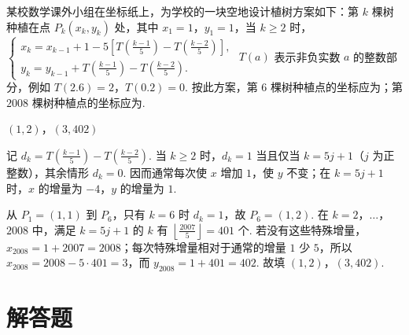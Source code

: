 \begin{problem}
某校数学课外小组在坐标纸上，为学校的一块空地设计植树方案如下：第 \(k\) 棵树种植在点 \(P_{k}(x_{k},y_{k})\) 处，其中 \(x_{1} = 1\)，\(y_{1} = 1\)，当 \(k \geqslant 2\) 时，\(\begin{cases}
x_{k} = x_{k - 1} + 1 - 5\left[ T\left(\frac{k - 1}{5}\right) - T\left(\frac{k - 2}{5}\right) \right],\\
y_{k} = y_{k - 1} + T\left(\frac{k - 1}{5}\right) - T\left(\frac{k - 2}{5}\right).
\end{cases}\) \(T(a)\) 表示非负实数 \(a\) 的整数部分，例如 \(T(2.6) = 2\)，\(T(0.2) = 0\). 按此方案，第 \(6\) 棵树种植点的坐标应为\fillinblank{}；第 \(2008\) 棵树种植点的坐标应为\fillinblank{}.

\begin{answer}
\((1,2)\)，\((3,402)\)
\end{answer}

\begin{solution}
记 \(d_k=T\left(\frac{k-1}{5}\right)-T\left(\frac{k-2}{5}\right)\). 当 \(k\geqslant2\) 时，\(d_k=1\) 当且仅当 \(k=5j+1\)（\(j\) 为正整数），其余情形 \(d_k=0\). 因而通常每次使 \(x\) 增加 \(1\)，使 \(y\) 不变；在 \(k=5j+1\) 时，\(x\) 的增量为 \(-4\)，\(y\) 的增量为 \(1\).

从 \(P_1=(1,1)\) 到 \(P_6\)，只有 \(k=6\) 时 \(d_k=1\)，故 \(P_6=(1,2)\). 在 \(k=2\)，\(\ldots\)，\(2008\) 中，满足 \(k=5j+1\) 的 \(k\) 有 \(\left\lfloor\frac{2007}{5}\right\rfloor=401\) 个. 若没有这些特殊增量，\(x_{2008}=1+2007=2008\)；每次特殊增量相对于通常的增量 \(1\) 少 \(5\)，所以 \(x_{2008}=2008-5\cdot401=3\)，而 \(y_{2008}=1+401=402\). 故填 \((1,2)\)，\((3,402)\).
\end{solution}
\end{problem}

\section{解答题}


